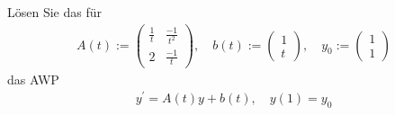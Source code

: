 \begin{exercise}
    Lösen Sie das für
    \begin{align*}
        A(t) := 
        \begin{pmatrix}
            \frac{1}{t} & \frac{-1}{t^2} \\
            2 & \frac{-1}{t}
        \end{pmatrix},
        \quad b(t) :=
        \begin{pmatrix}
            1 \\ t
        \end{pmatrix},
        \quad y_0 :=
        \begin{pmatrix}
            1 \\ 1
        \end{pmatrix}
    \end{align*}
    das AWP
    \begin{align*}
        y^\prime = A(t) y + b(t), \quad y(1) = y_0
    \end{align*}
\end{exercise}

